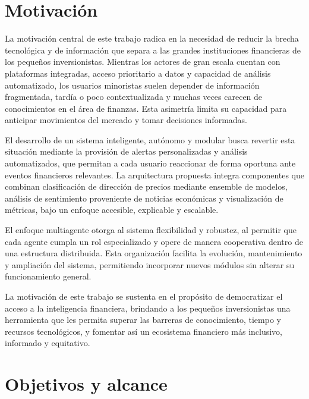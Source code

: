 
  \section{Motivación}

  La motivación central de este trabajo radica en la necesidad de reducir la brecha
  tecnológica y de información que separa a las grandes instituciones financieras de
  los pequeños inversionistas. Mientras los actores de gran escala cuentan con
  plataformas integradas, acceso prioritario a datos y capacidad de análisis
  automatizado, los usuarios minoristas suelen depender de información fragmentada,
  tardía o poco contextualizada y muchas veces carecen de conocimientos en el área
  de finanzas. Esta asimetría limita su capacidad para anticipar movimientos del
  mercado y tomar decisiones informadas.

  El desarrollo de un sistema inteligente, autónomo y modular busca revertir esta
  situación mediante la provisión de alertas personalizadas y análisis automatizados,
  que permitan a cada usuario reaccionar de forma oportuna ante eventos financieros
  relevantes. La arquitectura propuesta integra componentes que combinan clasificación        
  de dirección de precios mediante ensemble de modelos, análisis de sentimiento
  proveniente de noticias económicas y visualización de métricas, bajo un enfoque
  accesible, explicable y escalable.

  El enfoque multiagente otorga al sistema flexibilidad y robustez, al permitir que
  cada agente cumpla un rol especializado y opere de manera cooperativa dentro de una
  estructura distribuida. Esta organización facilita la evolución, mantenimiento y
  ampliación del sistema, permitiendo incorporar nuevos módulos sin alterar su
  funcionamiento general.

  La motivación de este trabajo se sustenta en el propósito de democratizar el acceso
  a la inteligencia financiera, brindando a los pequeños inversionistas una herramienta       
  que les permita superar las barreras de conocimiento, tiempo y recursos tecnológicos,       
  y fomentar así un ecosistema financiero más inclusivo, informado y equitativo.

  \section{Objetivos y alcance}

